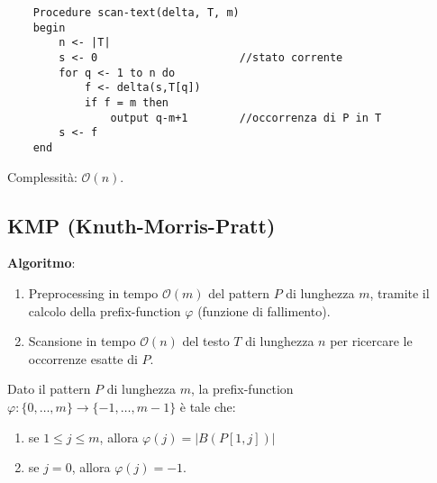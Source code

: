 \begin{lstlisting}
    Procedure scan-text(delta, T, m)
    begin
        n <- |T|
        s <- 0						//stato corrente
        for q <- 1 to n do 
            f <- delta(s,T[q])
            if f = m then
                output q-m+1		//occorrenza di P in T
		s <- f
    end
\end{lstlisting}


Complessità: $\mathcal{O}(n)$.

\subsection{KMP (Knuth-Morris-Pratt)}

\textbf{Algoritmo}:\\
\begin{enumerate}
    \item Preprocessing in tempo $\mathcal{O}(m)$ del pattern $P$ di lunghezza $m$, tramite il calcolo della prefix-function $\varphi$ (funzione di fallimento).
    \item Scansione in tempo $\mathcal{O}(n)$ del testo $T$ di lunghezza $n$ per ricercare le occorrenze esatte di $P$.
\end{enumerate}

Dato il pattern $P$ di lunghezza $m$, la prefix-function $\varphi : \{0, \dots, m\} \to \{-1, \dots, m-1\}$ è tale che:
\begin{enumerate}
    \item se $1 \leq j \leq m$, allora $\varphi (j) = |B(P[1,j])|$
    \item se $j=0$, allora $\varphi (j) = -1$.
\end{enumerate}